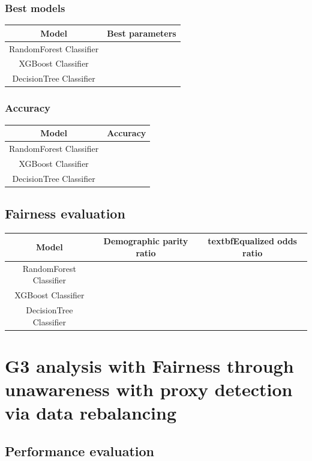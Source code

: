 \subsubsection{Best models}

\begin{tabular}{|c|c|}
    \hline
    \textbf{Model} & \textbf{Best parameters} \\
    \hline
    RandomForest Classifier  &  \\
    \hline
    XGBoost Classifier & \\
    \hline
    DecisionTree Classifier & \\
    \hline
\end{tabular}

\subsubsection{Accuracy}

\begin{tabular}{|c|c|}
    \hline
    \textbf{Model} & \textbf{Accuracy} \\ 
    \hline
    RandomForest Classifier  &  \\
    \hline
    XGBoost Classifier & \\
    \hline
    DecisionTree Classifier & \\ 
    \hline
\end{tabular}

\subsection{Fairness evaluation}

\begin{tabular}{|c|c|c|}
    \hline
    \textbf{Model} & \textbf{Demographic parity ratio} & textbf{Equalized odds ratio} \\
    \hline
    RandomForest Classifier & & \\
    \hline
    XGBoost Classifier & & \\
    \hline
    DecisionTree Classifier & & \\
    \hline
\end{tabular}


\section{G3 analysis with Fairness through unawareness with proxy detection via data rebalancing}

\subsection{Performance evaluation}

